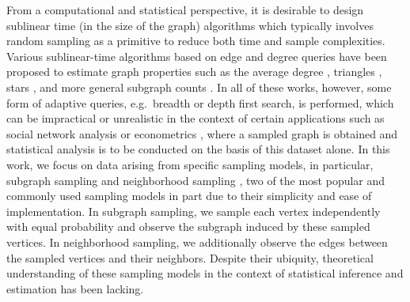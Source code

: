 
From a computational and statistical perspective, it is desirable to design sublinear time (in the size of the graph) algorithms which typically involves random sampling as a primitive to reduce both time and sample complexities. Various sublinear-time algorithms based on edge and degree queries have been proposed to estimate graph properties such as the average degree \cite{Goldreich2008, Feige2006}, triangles \cite{Eden2015}, stars \cite{aliakbarpour2017sublinear}, and more general subgraph counts \cite{Gonen2011}. In all of these works, however, some form of adaptive queries, e.g.~breadth or depth first search, is performed, which can be impractical or unrealistic in the context of certain applications such as social network analysis \cite{Apicella2012} or econometrics \cite{Chandrasekhar2011}, where a  sampled graph is obtained and statistical analysis is to be conducted on the basis of this dataset alone.
In this work, we focus on data arising from specific sampling models, in particular, subgraph sampling and neighborhood sampling \cite{Lovasz12}, 
two of the most popular and commonly used sampling models in part due to their simplicity and ease of implementation. In subgraph sampling, we sample each vertex independently with equal probability and observe the subgraph induced by these sampled vertices. In neighborhood sampling, we additionally observe the edges between the sampled vertices and their neighbors. 
Despite their ubiquity, theoretical understanding of these sampling models in the context of statistical inference and estimation has been lacking. 

